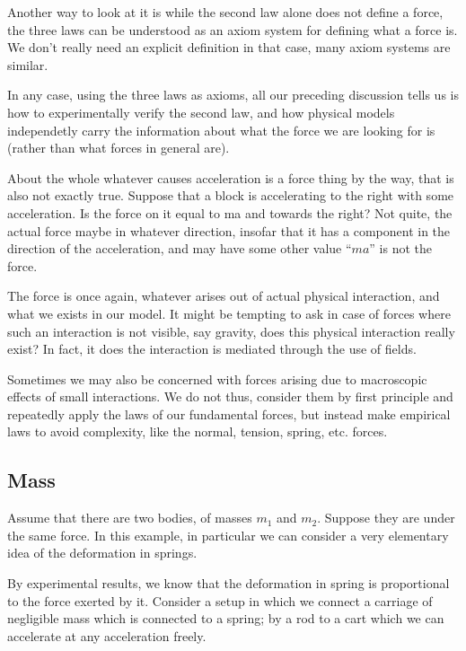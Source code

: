 Another way to look at it is while the second law alone does not define 
a force, the three laws can be understood as an axiom system for 
defining what a force is. We don't really need an explicit definition in 
that case, many axiom systems are similar.


In any case, using the three laws as axioms, all our preceding discussion tells us is how to experimentally verify
the second law, and how physical models independetly carry the information about what the force we are looking for is 
(rather than what forces in general are).

About the whole whatever causes acceleration is a force thing by the way, that is also not
exactly true. Suppose that a block is accelerating to the right with some acceleration. Is the
force on it equal to ma and towards the right? Not quite, the actual force maybe in whatever
direction, insofar that it has a component in the direction of the acceleration, and may have
some other value ``$ma$'' is not the force. 

The force is once again, whatever arises out of actual
physical interaction, and what we exists in our model.
It might be tempting to ask in case of forces where such an interaction is not visible, say
gravity, does this physical interaction really exist? In fact, it does the interaction is mediated
through the use of fields.

Sometimes we may also be concerned with forces arising due to macroscopic effects of small
interactions. We do not thus, consider them by first principle and repeatedly apply the laws of
our fundamental forces, but instead make empirical laws to avoid complexity, like the normal,
tension, spring, etc. forces.

\subsection{Mass}

Assume that there are two bodies, of masses $m_1$ and $m_2$. Suppose 
they are under the same force. In this example, in particular we can 
consider a very elementary idea of the deformation in springs.

By experimental results, we know that the deformation in spring is 
proportional to the force exerted by it. Consider a setup in which we 
connect a carriage of negligible mass which is connected to a spring; 
by a rod to a cart which we can accelerate at any acceleration freely.

